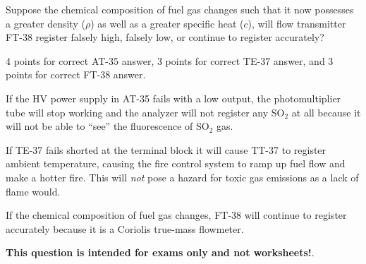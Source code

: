 \vskip 10pt

Suppose the chemical composition of fuel gas changes such that it now possesses a greater density ($\rho$) as well as a greater specific heat ($c$), will flow transmitter FT-38 register falsely high, falsely low, or continue to register accurately?







4 points for correct AT-35 answer, 3 points for correct TE-37 answer, and 3 points for correct FT-38 answer.

\vskip 10pt

If the HV power supply in AT-35 fails with a low output, the photomultiplier tube will stop working and the analyzer will not register any SO$_{2}$ at all because it will not be able to ``see'' the fluorescence of SO$_{2}$ gas.
 
\vskip 10pt

If TE-37 fails shorted at the terminal block it will cause TT-37 to register ambient temperature, causing the fire control system to ramp up fuel flow and make a hotter fire.  This will {\it not} pose a hazard for toxic gas emissions as a lack of flame would.

\vskip 10pt

If the chemical composition of fuel gas changes, FT-38 will continue to register accurately because it is a Coriolis true-mass flowmeter.







{\bf This question is intended for exams only and not worksheets!}.



